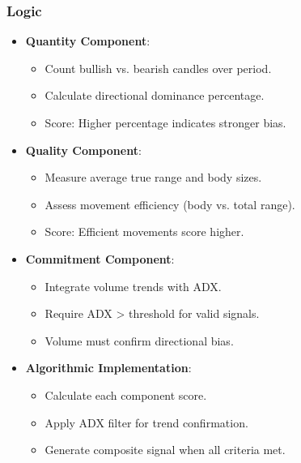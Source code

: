 \documentclass[12pt]{article}
\begin{document}
\subsubsection{Logic}
\begin{itemize}
\item \textbf{Quantity Component}:
  \begin{itemize}
  \item Count bullish vs. bearish candles over period.
  \item Calculate directional dominance percentage.
  \item Score: Higher percentage indicates stronger bias.
  \end{itemize}
\item \textbf{Quality Component}:
  \begin{itemize}
  \item Measure average true range and body sizes.
  \item Assess movement efficiency (body vs. total range).
  \item Score: Efficient movements score higher.
  \end{itemize}
\item \textbf{Commitment Component}:
  \begin{itemize}
  \item Integrate volume trends with ADX.
  \item Require ADX > threshold for valid signals.
  \item Volume must confirm directional bias.
  \end{itemize}
\item \textbf{Algorithmic Implementation}:
  \begin{itemize}
  \item Calculate each component score.
  \item Apply ADX filter for trend confirmation.
  \item Generate composite signal when all criteria met.
  \end{itemize}
\end{itemize}
\end{document}
